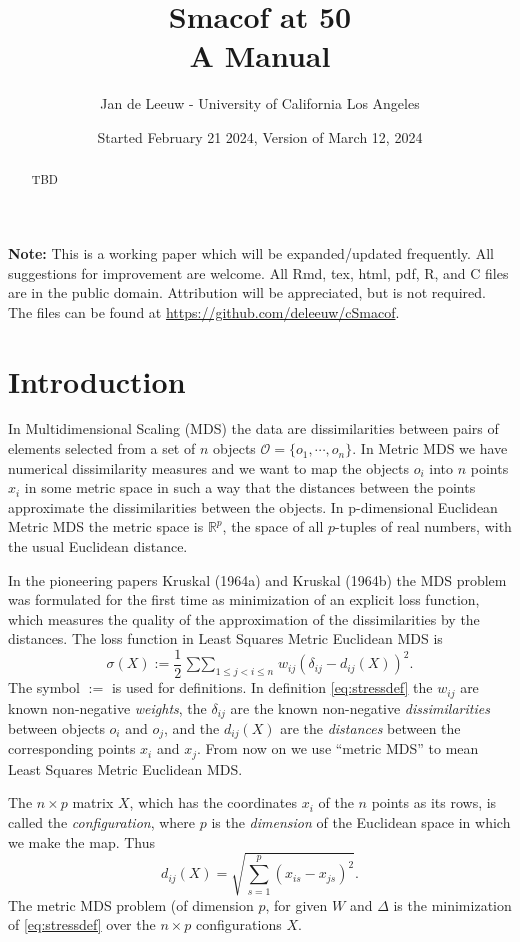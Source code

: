 \documentclass[
  12pt,
]{article}
\title{Smacof at 50\\
A Manual}
\author{Jan de Leeuw - University of California Los Angeles}
\date{Started February 21 2024, Version of March 12, 2024}
\newcommand{\jis}{\mathop{\sum\sum}_{1\leq j<i\leq n}}
\begin{document}
\maketitle
\begin{abstract}
TBD
\end{abstract}

{
\setcounter{tocdepth}{4}
\tableofcontents
}
\textbf{Note:} This is a working paper which will be expanded/updated
frequently. All suggestions for improvement are welcome. All Rmd, tex,
html, pdf, R, and C files are in the public domain. Attribution will be
appreciated, but is not required. The files can be found at
\url{https://github.com/deleeuw/cSmacof}.

\section{Introduction}\label{introduction}

In Multidimensional Scaling (MDS) the data are
dissimilarities between pairs of elements selected from
a set of \(n\) objects \(\mathcal{O}=\{o_1,\cdots,o_n\}\). In
Metric MDS we have numerical dissimilarity measures and we want to map
the objects \(o_i\) into \(n\) points \(x_i\) in some metric space in such a way
that the distances between the points approximate the dissimilarities
between the objects. In p-dimensional Euclidean Metric MDS the metric space is \(\mathbb{R}^p\), the space of all \(p\)-tuples of real numbers, with the usual Euclidean distance.

In the pioneering papers Kruskal (1964a) and Kruskal (1964b) the MDS problem
was formulated for the first time as minimization of an explicit loss
function, which measures the quality of the approximation of the
dissimilarities by the distances. The loss function in Least Squares Metric Euclidean MDS
is \begin{equation}
\sigma(X):=\frac12\jis w_{ij}(\delta_{ij}-d_{ij}(X))^2.
\label{eq:stressdef}
\end{equation}
The symbol \(:=\) is used for definitions. In definition
\eqref{eq:stressdef} the \(w_{ij}\) are known non-negative \emph{weights}, the \(\delta_{ij}\) are the known
non-negative \emph{dissimilarities} between objects \(o_i\) and \(o_j\), and the
\(d_{ij}(X)\) are the \emph{distances} between the corresponding points \(x_i\)
and \(x_j\). From now on we use ``metric MDS'' to
mean Least Squares Metric Euclidean MDS.

The \(n\times p\) matrix \(X\), which has the coordinates \(x_i\)
of the \(n\) points as its rows, is called the \emph{configuration}, where
\(p\) is the \emph{dimension} of the Euclidean space in which we make the
map. Thus
\begin{equation}
d_{ij}(X)=\sqrt{\sum_{s=1}^p(x_{is}-x_{js})^2}.
\label{eq:ddef}
\end{equation}
The metric MDS problem (of dimension \(p\), for given \(W\) and \(\Delta\)
is the minimization of \eqref{eq:stressdef} over the \(n\times p\)
configurations \(X\).
\end{document}
